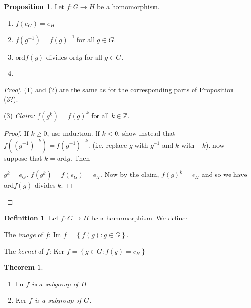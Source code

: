 \documentclass{article}
\newtheorem{theorem}{Theorem}[section]
\theoremstyle{definition}
\newtheorem{definition}{Definition}[section]
\newtheorem{proposition}{Proposition}
\begin{document}
\begin{proposition}
  Let $f: G \rightarrow H$ be a homomorphism. 
  \begin{enumerate}
    \item $f(e_G)=e_H$
    \item $f(g^{-1})=f(g)^{-1}$ for all $g \in G$.
    \item $\text{ord}f(g)$ divides $\text{ord}g$ for all $g \in G$.
    \item
  \end{enumerate}
\end{proposition}

\begin{proof}
  (1) and (2) are the same as for the corresponding parts of Proposition (3?).

  (3) \emph{Claim:} $f(g^k)=f(g)^k$ for all $k\in \mathbb{Z}.$
  \begin{proof}
    If $k \geq 0$, use induction. If $k<0$, show instead that $f\left( \left( g^{-1} \right)^{-k} \right)=f(g^{-1})^{-k}$. (i.e. replace $g$ with $g^{-1}$ and $k$ with $-k$). now suppose that $k=\text{ord}g$. Then

    $g^k = e_G$. $f(g^k)=f(e_G)=e_H$. Now by the claim, $f(g)^k=e_H$ and so we have $\text{ord}f(g)$ divides $k$.
  \end{proof}
\end{proof}

\begin{definition}
  Let $f:G \rightarrow H$ be a homomorphism. We define: 
  
  The \emph{image} of $f$: $\text{Im } f = \left\{ f(g) : g \in G \right\}$.

  The \emph{kernel} of $f$: $\text{Ker } f=\left\{ g \in G : f(g) = e_H \right\}$ 
\end{definition}

\begin{theorem}
  \begin{enumerate}
    \item 
  $\text{Im } f$ is a subgroup of $H$.
    \item
  $\text{Ker } f$ is a subgroup of $G$.
  \end{enumerate}
  \label{}
\end{theorem}
\end{document}
